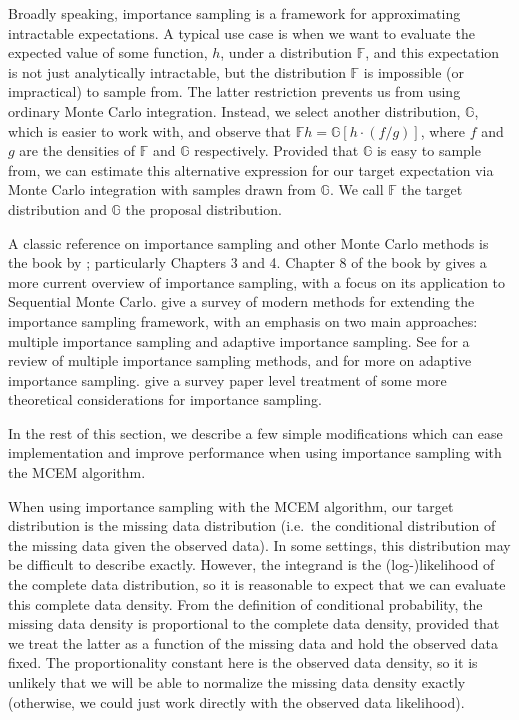 \documentclass[11pt, oneside]{article}   	%
\newcommand{\bF}{\mathbb{F}}
\newcommand{\bG}{\mathbb{G}}
\begin{document}
Broadly speaking, importance sampling is a framework for approximating intractable expectations. A typical use case is when we want to evaluate the expected value of some function, $h$, under a distribution $\bF$, and this expectation is not just analytically intractable, but the distribution $\bF$ is impossible (or impractical) to sample from. The latter restriction prevents us from using ordinary Monte Carlo integration. Instead, we select another distribution, $\bG$, which is easier to work with, and observe that $\bF h = \bG [h \cdot (f/g)]$, where $f$ and $g$ are the densities of $\bF$ and $\bG$ respectively. Provided that $\bG$ is easy to sample from, we can estimate this alternative expression for our target expectation via Monte Carlo integration with samples drawn from $\bG$. We call $\bF$ the target distribution and $\bG$ the proposal distribution.  

A classic reference on importance sampling and other Monte Carlo methods is the book by \citet{Rob04}; particularly Chapters 3 and 4. Chapter 8 of the book by \citet{Cho20} gives a more current overview of importance sampling, with a focus on its application to Sequential Monte Carlo. \citet{Elv22} give a survey of modern methods for extending the importance sampling framework, with an emphasis on two main approaches: multiple importance sampling and adaptive importance sampling. See \citet{Elv19} for a review of multiple importance sampling methods, and \citet{Bug17} for more on adaptive importance sampling. \citet{Aga17} give a survey paper level treatment of some more theoretical considerations for importance sampling.

In the rest of this section, we describe a few simple modifications which can ease implementation and improve performance when using importance sampling with the MCEM algorithm.

When using importance sampling with the MCEM algorithm, our target distribution is the missing data distribution (i.e.\ the conditional distribution of the missing data given the observed data). In some settings, this distribution may be difficult to describe exactly. However, the integrand is the (log-)likelihood of the complete data distribution, so it is reasonable to expect that we can evaluate this complete data density. From the definition of conditional probability, the missing data density is proportional to the complete data density, provided that we treat the latter as a function of the missing data and hold the observed data fixed. The proportionality constant here is the observed data density, so it is unlikely that we will be able to normalize the missing data density exactly (otherwise, we could just work directly with the observed data likelihood). 
\end{document}

